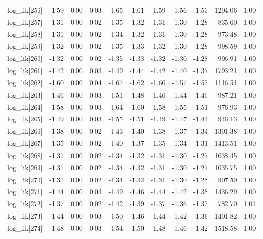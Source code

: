 \begin{table}[ht]
\begin{tabular}{rrrrrrrrrrr}
  log\_lik[256] & -1.59 & 0.00 & 0.03 & -1.65 & -1.61 & -1.59 & -1.56 & -1.53 & 1204.06 & 1.00 \\ 
  log\_lik[257] & -1.31 & 0.00 & 0.02 & -1.35 & -1.32 & -1.31 & -1.30 & -1.28 & 835.60 & 1.00 \\ 
  log\_lik[258] & -1.31 & 0.00 & 0.02 & -1.34 & -1.32 & -1.31 & -1.30 & -1.28 & 973.48 & 1.00 \\ 
  log\_lik[259] & -1.32 & 0.00 & 0.02 & -1.35 & -1.33 & -1.32 & -1.30 & -1.28 & 998.59 & 1.00 \\ 
  log\_lik[260] & -1.32 & 0.00 & 0.02 & -1.35 & -1.33 & -1.32 & -1.30 & -1.28 & 996.91 & 1.00 \\ 
  log\_lik[261] & -1.42 & 0.00 & 0.03 & -1.49 & -1.44 & -1.42 & -1.40 & -1.37 & 1793.21 & 1.00 \\ 
  log\_lik[262] & -1.60 & 0.00 & 0.04 & -1.67 & -1.62 & -1.60 & -1.57 & -1.53 & 1116.51 & 1.00 \\ 
  log\_lik[263] & -1.46 & 0.00 & 0.03 & -1.51 & -1.48 & -1.46 & -1.44 & -1.40 & 987.21 & 1.00 \\ 
  log\_lik[264] & -1.58 & 0.00 & 0.03 & -1.64 & -1.60 & -1.58 & -1.55 & -1.51 & 976.93 & 1.00 \\ 
  log\_lik[265] & -1.49 & 0.00 & 0.03 & -1.55 & -1.51 & -1.49 & -1.47 & -1.44 & 946.13 & 1.00 \\ 
  log\_lik[266] & -1.38 & 0.00 & 0.02 & -1.43 & -1.40 & -1.38 & -1.37 & -1.34 & 1301.38 & 1.00 \\ 
  log\_lik[267] & -1.35 & 0.00 & 0.02 & -1.40 & -1.37 & -1.35 & -1.34 & -1.31 & 1413.51 & 1.00 \\ 
  log\_lik[268] & -1.31 & 0.00 & 0.02 & -1.34 & -1.32 & -1.31 & -1.30 & -1.27 & 1038.45 & 1.00 \\ 
  log\_lik[269] & -1.31 & 0.00 & 0.02 & -1.34 & -1.32 & -1.31 & -1.30 & -1.27 & 1035.75 & 1.00 \\ 
  log\_lik[270] & -1.31 & 0.00 & 0.02 & -1.34 & -1.32 & -1.31 & -1.30 & -1.28 & 907.50 & 1.00 \\ 
  log\_lik[271] & -1.44 & 0.00 & 0.03 & -1.49 & -1.46 & -1.44 & -1.42 & -1.38 & 1436.29 & 1.00 \\ 
  log\_lik[272] & -1.37 & 0.00 & 0.02 & -1.42 & -1.39 & -1.37 & -1.36 & -1.33 & 782.70 & 1.01 \\ 
  log\_lik[273] & -1.44 & 0.00 & 0.03 & -1.50 & -1.46 & -1.44 & -1.42 & -1.39 & 1401.82 & 1.00 \\ 
  log\_lik[274] & -1.48 & 0.00 & 0.03 & -1.54 & -1.50 & -1.48 & -1.46 & -1.42 & 1518.58 & 1.00 \\ 

\end{tabular}
\end{table}
